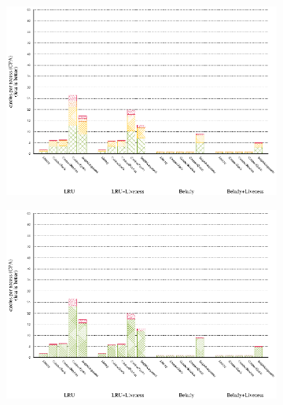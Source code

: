 \documentclass[onecolumn, openright, master, english, signatures]{dbrgrptt}
\begin{document}
\begin{figure}[!ht]
  \begin{subfigure}[b]{0.5\textwidth}%
    \includegraphics[width=\textwidth]{figs/plots/perf-471-omnetpp.eps}
  \end{subfigure}%
  \begin{subfigure}[b]{0.5\textwidth}%
    \includegraphics[width=\textwidth]{figs/plots/perf-misses-471-omnetpp.eps}
  \end{subfigure}%
  \caption{}
  \label{fig:todo}
\end{figure}
\end{document}
